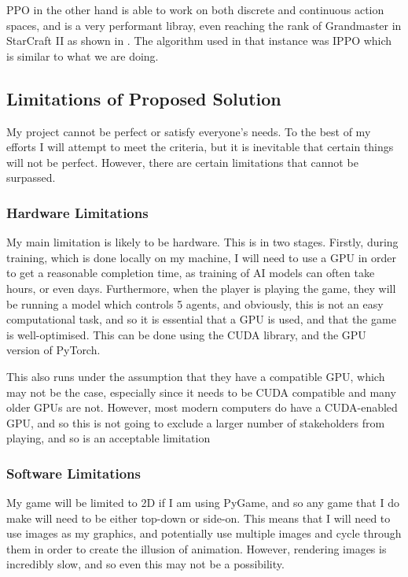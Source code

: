 \vs
PPO in the other hand is able to work on both discrete and continuous action spaces, and is a very performant libray, even reaching the rank of Grandmaster in StarCraft II as shown in \cite{alpha_star}. The algorithm used in that instance was IPPO which is similar to what we are doing.
\vs

\subsection{Limitations of Proposed Solution}

My project cannot be perfect or satisfy everyone's needs. To the best of my efforts I will attempt to meet the criteria, but it is inevitable that certain things will not be perfect. However, there are certain limitations that cannot be surpassed.

\vs
\subsubsection{Hardware Limitations}

My main limitation is likely to be hardware. This is in two stages. Firstly, during training, which is done locally on my machine, I will need to use a GPU in order to get a reasonable completion time, as training of AI models can often take hours, or even days. Furthermore, when the player is playing the game, they will be running a model which controls 5 agents, and obviously, this is not an easy computational task, and so it is essential that a GPU is used, and that the game is well-optimised. This can be done using the CUDA library, and the GPU version of PyTorch.

\vs
This also runs under the assumption that they have a compatible GPU, which may not be the case, especially since it needs to be CUDA compatible and many older GPUs are not. However, most modern computers do have a CUDA-enabled GPU, and so this is not going to exclude a larger number of stakeholders from playing, and so is an acceptable limitation


\subsubsection{Software Limitations}
\vs
My game will be limited to 2D if I am using PyGame, and so any game that I do make will need to be either top-down or side-on. This means that I will need to use images as my graphics, and potentially use multiple images and cycle through them in order to create the illusion of animation. However, rendering images is incredibly slow, and so even this may not be a possibility.

